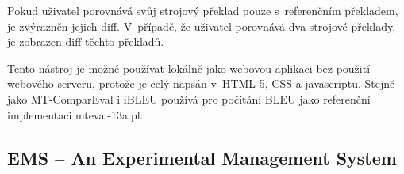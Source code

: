 Pokud uživatel porovnává svůj strojový překlad pouze s~referenčním překladem,
  je zvýrazněn jejich diff.
V~případě, že uživatel porovnává dva strojové překlady,
  je zobrazen diff těchto překladů.

Tento nástroj je možné používat lokálně jako webovou aplikaci bez použití webového serveru,
  protože je celý napsán v~HTML 5, CSS a javascriptu.
Stejně jako \mbox{MT-ComparEval} i iBLEU používá pro počítání BLEU jako referenční implementaci mteval-13a.pl.

\subsection{EMS -- An Experimental Management System}
